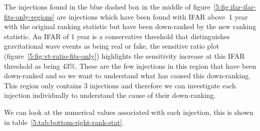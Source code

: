 The injections found in the blue dashed box in the middle of figure~\ref{5:fig:ifar-ifar-fits-only-regions} are injections which have been found with IFAR above $~1$ year with the original ranking statistic but have been down-ranked by the new ranking statistic. An IFAR of $1$ year is a conservative threshold that distinguishes gravitational wave events as being real or fake, the sensitive ratio plot (figure~\ref{5:fig:vt-ratio-fits-only}) highlights the sensitivity increase at this IFAR threshold as being $43\%$. These are the few injections in this region that have been down-ranked and so we want to understand what has caused this down-ranking. This region only contains $3$ injections and therefore we can investigate each injection individually to understand the cause of their down-ranking.

We can look at the numerical values associated with each injection, this is shown in table~\ref{5:tab:bottom-right-rank-stat}.
%
